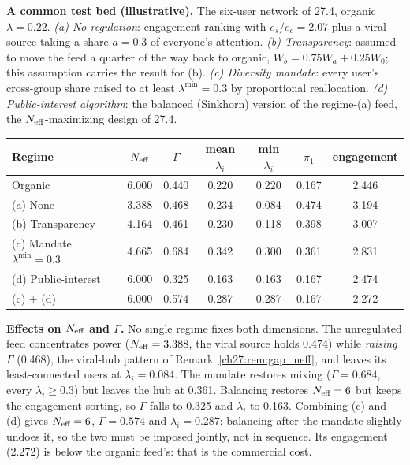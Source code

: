 \documentclass[../solutions_manual.tex]{subfiles}
\begin{document}
 \textbf{A common test bed (illustrative).} The six-user network of 27.4, organic $\lambda = 0.22$. \emph{(a) No regulation}: engagement ranking with $e_s/e_c = 2.07$ plus a viral source taking a share $a = 0.3$ of everyone's attention. \emph{(b) Transparency}: assumed to move the feed a quarter of the way back to organic, $W_b = 0.75W_a + 0.25W_0$; this assumption carries the result for (b). \emph{(c) Diversity mandate}: every user's cross-group share raised to at least $\lambda^{\min} = 0.3$ by proportional reallocation. \emph{(d) Public-interest algorithm}: the balanced (Sinkhorn) version of the regime-(a) feed, the $N_{\text{eff}}$-maximizing design of 27.4.
\begin{center}
\small
\begin{tabular}{lcccccc}
\toprule
Regime & $N_{\text{eff}}$ & $\Gamma$ & mean $\lambda_i$ & min $\lambda_i$ & $\pi_1$ & engagement \\
\midrule
Organic & 6.000 & 0.440 & 0.220 & 0.220 & 0.167 & 2.446 \\
(a) None & 3.388 & 0.468 & 0.234 & 0.084 & 0.474 & 3.194 \\
(b) Transparency & 4.164 & 0.461 & 0.230 & 0.118 & 0.398 & 3.007 \\
(c) Mandate $\lambda^{\min} = 0.3$ & 4.665 & 0.684 & 0.342 & 0.300 & 0.361 & 2.831 \\
(d) Public-interest & 6.000 & 0.325 & 0.163 & 0.163 & 0.167 & 2.474 \\
(c) + (d) & 6.000 & 0.574 & 0.287 & 0.287 & 0.167 & 2.272 \\
\bottomrule
\end{tabular}
\end{center}

 \textbf{Effects on $N_{\text{eff}}$ and $\Gamma$.} No single regime fixes both dimensions. The unregulated feed concentrates power ($N_{\text{eff}} = 3.388$, the viral source holds 0.474) while \emph{raising} $\Gamma$ (0.468), the viral-hub pattern of Remark~\ref{ch27:rem:gap_neff}, and leaves its least-connected users at $\lambda_i = 0.084$. The mandate restores mixing ($\Gamma = 0.684$, every $\lambda_i \ge 0.3$) but leaves the hub at 0.361. Balancing restores $N_{\text{eff}} = 6$ but keeps the engagement sorting, so $\Gamma$ falls to 0.325 and $\lambda_i$ to 0.163. Combining (c) and (d) gives $N_{\text{eff}} = 6$, $\Gamma = 0.574$ and $\lambda_i = 0.287$: balancing after the mandate slightly undoes it, so the two must be imposed jointly, not in sequence. Its engagement (2.272) is below the organic feed's: that is the commercial cost.
\end{document}
